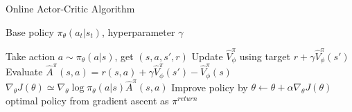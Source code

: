 \begin{algorithm}[t!]
\caption{Online Actor-Critic Algorithm}
\begin{algorithmic}[1]
\label{alg:onlineac}
\REQUIRE Base policy $\pi_\theta(a_t|s_t)$, hyperparameter $\gamma$

    \STATE Take action $a\sim\pi_\theta(a|s)$, get $(s,a,s',r)$
    \STATE Update $\hat{V}^\pi_\phi$ using target $r+\gamma\hat{V}^\pi_\phi(s')$
    \STATE Evaluate $\hat{A}^\pi(s,a)=r(s,a)+\gamma\hat{V}^\pi_\phi(s')-\hat{V}^\pi_\phi(s)$
    \STATE $\nabla_\theta J(\theta) \simeq \nabla_\theta\log \pi_\theta(a|s)\hat{A}^\pi(s,a)$
    \STATE Improve policy by $\theta \leftarrow \theta + \alpha\nabla_\theta J(\theta)$
\ENDWHILE
\RETURN optimal policy from gradient ascent as $\pi^{return}$
\end{algorithmic}
\end{algorithm}